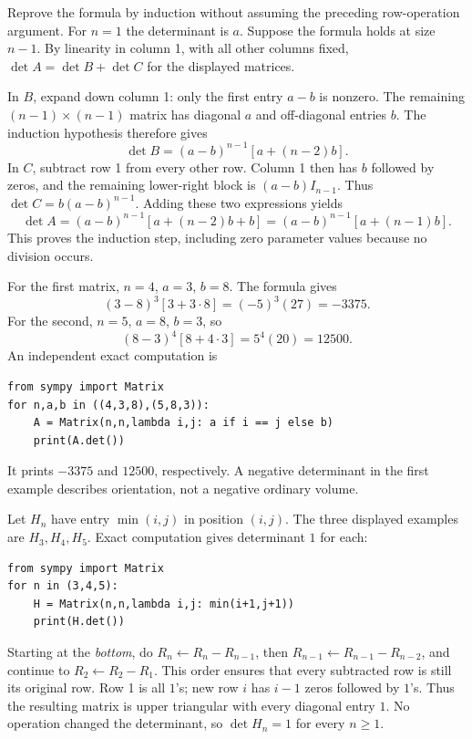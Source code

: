 \goal Reprove the formula by induction without assuming the preceding row-operation argument.
For $n=1$ the determinant is $a$. Suppose the formula holds at size $n-1$. By linearity in column 1, with all other columns fixed, $\det A=\det B+\det C$ for the displayed matrices.

In $B$, expand down column 1: only the first entry $a-b$ is nonzero. The remaining $(n-1)\times(n-1)$ matrix has diagonal $a$ and off-diagonal entries $b$. The induction hypothesis therefore gives
\[
\det B=(a-b)^{n-1}[a+(n-2)b].
\]
In $C$, subtract row 1 from every other row. Column 1 then has $b$ followed by zeros, and the remaining lower-right block is $(a-b)I_{n-1}$. Thus $\det C=b(a-b)^{n-1}$. Adding these two expressions yields
\[
\det A=(a-b)^{n-1}[a+(n-2)b+b]
=(a-b)^{n-1}[a+(n-1)b].
\]
This proves the induction step, including zero parameter values because no division occurs.

For the first matrix, $n=4$, $a=3$, $b=8$. The formula gives
\[
(3-8)^3[3+3\cdot8]=(-5)^3(27)=-3375.
\]
For the second, $n=5$, $a=8$, $b=3$, so
\[
(8-3)^4[8+4\cdot3]=5^4(20)=12500.
\]
An independent exact computation is
\begin{verbatim}
from sympy import Matrix
for n,a,b in ((4,3,8),(5,8,3)):
    A = Matrix(n,n,lambda i,j: a if i == j else b)
    print(A.det())
\end{verbatim}
It prints $-3375$ and $12500$, respectively. A negative determinant in the first example describes orientation, not a negative ordinary volume.

Let $H_n$ have entry $\min(i,j)$ in position $(i,j)$. The three displayed examples are $H_3,H_4,H_5$. Exact computation gives determinant $1$ for each:
\begin{verbatim}
from sympy import Matrix
for n in (3,4,5):
    H = Matrix(n,n,lambda i,j: min(i+1,j+1))
    print(H.det())
\end{verbatim}
Starting at the \emph{bottom}, do $R_n\leftarrow R_n-R_{n-1}$, then $R_{n-1}\leftarrow R_{n-1}-R_{n-2}$, and continue to $R_2\leftarrow R_2-R_1$. This order ensures that every subtracted row is still its original row. Row 1 is all $1$'s; new row $i$ has $i-1$ zeros followed by $1$'s. Thus the resulting matrix is upper triangular with every diagonal entry $1$. No operation changed the determinant, so $\det H_n=1$ for every $n\ge1$.

